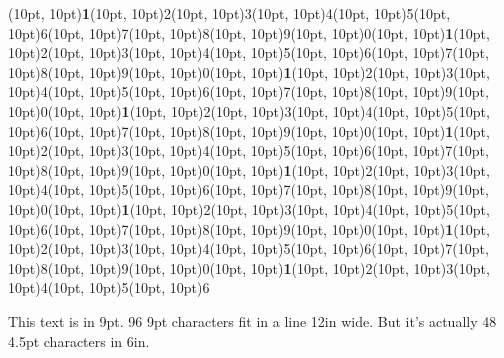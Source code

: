 \documentclass[10,a4paper]{article}
\newcommand{\highlight}[1]{{\color{red}\textbf{1}}}
\begin{document}
{{\begin{minipage}{12in}
\framebox(10pt, 10pt){\highlight{1}}\framebox(10pt,
10pt){2}\framebox(10pt, 10pt){3}\framebox(10pt,
10pt){4}\framebox(10pt, 10pt){5}\framebox(10pt,
10pt){6}\framebox(10pt, 10pt){7}\framebox(10pt,
10pt){8}\framebox(10pt, 10pt){9}\noindent\framebox(10pt, 10pt){0}\framebox(10pt, 10pt){\highlight{1}}\framebox(10pt,
10pt){2}\framebox(10pt, 10pt){3}\framebox(10pt,
10pt){4}\framebox(10pt, 10pt){5}\framebox(10pt,
10pt){6}\framebox(10pt, 10pt){7}\framebox(10pt,
10pt){8}\framebox(10pt, 10pt){9}\noindent\framebox(10pt, 10pt){0}\framebox(10pt, 10pt){\highlight{1}}\framebox(10pt,
10pt){2}\framebox(10pt, 10pt){3}\framebox(10pt,
10pt){4}\framebox(10pt, 10pt){5}\framebox(10pt,
10pt){6}\framebox(10pt, 10pt){7}\framebox(10pt,
10pt){8}\framebox(10pt, 10pt){9}\noindent\framebox(10pt, 10pt){0}\framebox(10pt, 10pt){\highlight{1}}\framebox(10pt,
10pt){2}\framebox(10pt, 10pt){3}\framebox(10pt,
10pt){4}\framebox(10pt, 10pt){5}\framebox(10pt,
10pt){6}\framebox(10pt, 10pt){7}\framebox(10pt,
10pt){8}\framebox(10pt, 10pt){9}\framebox(10pt, 10pt){0}\framebox(10pt, 10pt){\highlight{1}}\framebox(10pt,
10pt){2}\framebox(10pt, 10pt){3}\framebox(10pt,
10pt){4}\framebox(10pt, 10pt){5}\framebox(10pt,
10pt){6}\framebox(10pt, 10pt){7}\framebox(10pt,
10pt){8}\framebox(10pt, 10pt){9}\noindent\framebox(10pt, 10pt){0}\framebox(10pt, 10pt){\highlight{1}}\framebox(10pt,
10pt){2}\framebox(10pt, 10pt){3}\framebox(10pt,
10pt){4}\framebox(10pt, 10pt){5}\framebox(10pt,
10pt){6}\framebox(10pt, 10pt){7}\framebox(10pt,
10pt){8}\framebox(10pt, 10pt){9}\noindent\framebox(10pt, 10pt){0}\framebox(10pt, 10pt){\highlight{1}}\framebox(10pt,
10pt){2}\framebox(10pt, 10pt){3}\framebox(10pt,
10pt){4}\framebox(10pt, 10pt){5}\framebox(10pt,
10pt){6}\framebox(10pt, 10pt){7}\framebox(10pt,
10pt){8}\framebox(10pt, 10pt){9}\noindent\framebox(10pt, 10pt){0}\framebox(10pt, 10pt){\highlight{1}}\framebox(10pt,
10pt){2}\framebox(10pt, 10pt){3}\framebox(10pt,
10pt){4}\framebox(10pt, 10pt){5}\framebox(10pt,
10pt){6}\framebox(10pt, 10pt){7}\framebox(10pt,
10pt){8}\framebox(10pt, 10pt){9}\framebox(10pt, 10pt){0}\framebox(10pt, 10pt){\highlight{1}}\framebox(10pt,
10pt){2}\framebox(10pt, 10pt){3}\framebox(10pt,
10pt){4}\framebox(10pt, 10pt){5}\framebox(10pt,
10pt){6}

\vspace{0.7\baselineskip}

\vspace{0.7\baselineskip}

\fontsize{9}{9}\selectfont

This text is in 9pt. 96 9pt characters fit in a line 12in wide. But
it's actually 48 4.5pt characters in 6in.


\end{minipage}}}
\end{document}

